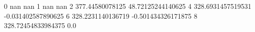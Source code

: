 0 nan nan
1 nan nan
2 377.44580078125 48.72125244140625
4 328.6931457519531 -0.031402587890625
6 328.2231140136719 -0.501434326171875
8 328.72454833984375 0.0
